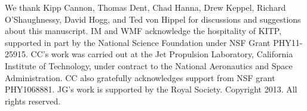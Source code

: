 \documentclass[aps,prd,reprint,nofootinbib]{revtex4-1}
\begin{document}
\begin{acknowledgments}
  We thank Kipp Cannon, Thomas Dent, Chad Hanna, Drew Keppel, Richard
  O'Shaughnessy, David Hogg, and Ted von Hippel for discussions and
  suggestions about this manuscript.  IM and WMF acknowledge the
  hospitality of KITP, supported in part by the National Science
  Foundation under NSF Grant PHY11-25915.  CC's work was carried out
  at the Jet Propulsion Laboratory, California Institute of
  Technology, under contract to the National Aeronautics and Space
  Administration.  CC also gratefully acknowledges support from NSF
  grant PHY1068881.  JG's work is supported by the Royal Society.
  Copyright 2013.  All rights reserved.
\end{acknowledgments}

 
\end{document}
